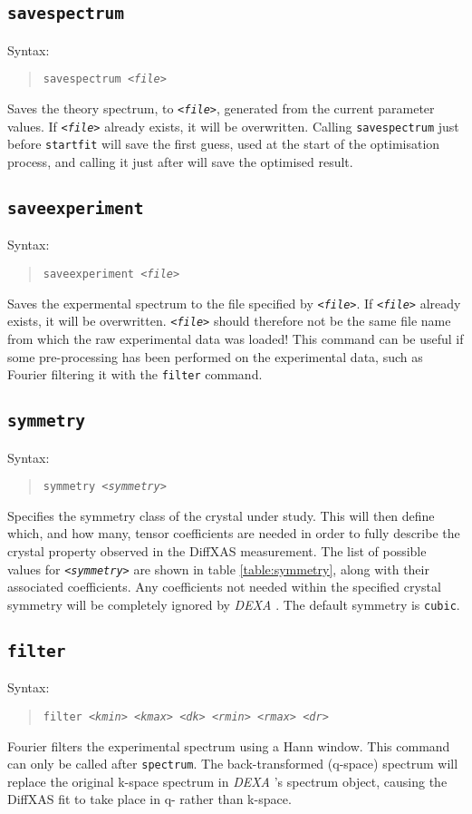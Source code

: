 \documentclass[a4paper,12pt]{report}
\newcommand{\dexa}{\emph{DEXA} }
\begin{document}
\subsection{\texttt{savespectrum}}
Syntax:
\begin{quote}
  \texttt{savespectrum \emph{<file>}}
\end{quote}
Saves the theory spectrum, to \texttt{\emph{<file>}}, generated from the current parameter values. If \texttt{\emph{<file>}} already exists, it will be overwritten. Calling \verb|savespectrum| just before \verb|startfit| will save the first guess, used at the start of the optimisation process, and calling it just after will save the optimised result.

\subsection{\texttt{saveexperiment}}
Syntax:
\begin{quote}
  \texttt{saveexperiment \emph{<file>}}
\end{quote}
Saves the expermental spectrum to the file specified by \texttt{\emph{<file>}}. If \texttt{\emph{<file>}} already exists, it will be overwritten. \texttt{\emph{<file>}} should therefore not be the same file name from which the raw experimental data was loaded! This command can be useful if some pre-processing has been performed on the experimental data, such as Fourier filtering it with the \verb|filter| command.

\subsection{\texttt{symmetry}}
Syntax:
\begin{quote}
  \texttt{symmetry \emph{<symmetry>}}
\end{quote}
Specifies the symmetry class of the crystal under study. This will then define which, and how many, tensor coefficients are needed in order to fully describe the crystal property observed in the DiffXAS measurement. The list of possible values for \texttt{\emph{<symmetry>}} are shown in table \ref{table:symmetry}, along with their associated coefficients. Any coefficients not needed within the specified crystal symmetry will be completely ignored by \dexa. The default symmetry is \verb|cubic|.


\subsection{\texttt{filter}}
Syntax:
\begin{quote}
  \texttt{filter \emph{<kmin> <kmax> <dk> <rmin> <rmax> <dr>}}
\end{quote}
Fourier filters the experimental spectrum using a Hann window. This command can only be called after \verb|spectrum|. The back-transformed (q-space) spectrum will replace the original k-space spectrum in \dexa's spectrum object, causing the DiffXAS fit to take place in q- rather than k-space.
\end{document}
